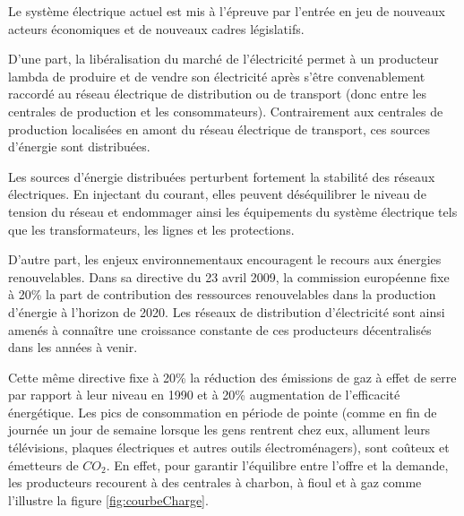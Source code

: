 Le système électrique actuel est mis à l'épreuve par l'entrée en jeu de nouveaux acteurs économiques et de nouveaux cadres législatifs. 

D'une part, la libéralisation du marché de l'électricité permet à un producteur lambda de produire et de vendre son électricité après s'être convenablement raccordé au réseau électrique de distribution ou de transport (donc entre les centrales de production et les consommateurs). Contrairement aux centrales de production localisées en amont du réseau électrique de transport, ces sources d'énergie sont distribuées. 

Les sources d'énergie distribuées perturbent fortement la stabilité des réseaux électriques. En injectant du courant, elles peuvent déséquilibrer le niveau de tension du réseau et endommager ainsi les équipements du système électrique tels que les transformateurs, les lignes et les protections. 

D'autre part, les enjeux environnementaux encouragent le recours aux énergies renouvelables. Dans sa directive du 23 avril 2009, la commission européenne fixe à 20\% la part de contribution des ressources renouvelables dans la production d'énergie à l'horizon de 2020. Les réseaux de distribution d'électricité sont ainsi amenés à connaître une croissance constante de ces producteurs décentralisés dans les années à venir.

Cette même directive fixe à 20\% la réduction des émissions de gaz à effet de serre par rapport à leur niveau en 1990 et à 20\% augmentation de l'efficacité énergétique. Les pics de consommation en période de pointe (comme en fin de journée un jour de semaine lorsque les gens rentrent chez eux, allument leurs télévisions, plaques électriques et autres outils électroménagers), sont coûteux et émetteurs de $CO_{2}$. En effet, pour garantir l'équilibre entre l'offre et la demande, les producteurs recourent à des centrales à charbon, à fioul et à gaz comme l'illustre la figure \ref{fig:courbeCharge}.

